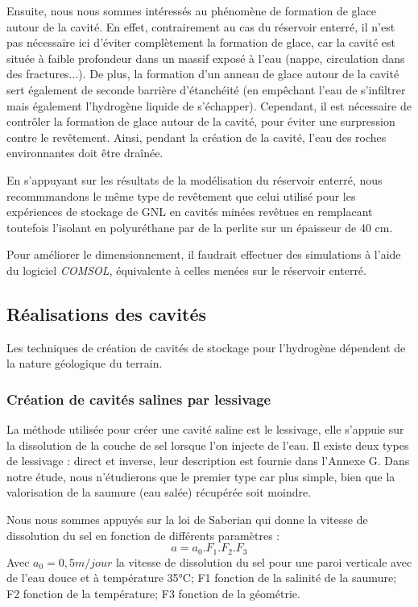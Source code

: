 \documentclass[11pt,french,a4paper]{article}
\begin{document}
Ensuite, nous nous sommes intéressés au phénomène de formation de glace autour de la cavité. En effet, contrairement au cas du réservoir enterré, il n’est pas nécessaire ici d’éviter complètement la formation de glace, car la cavité est située à faible profondeur dans un massif exposé à l'eau (nappe, circulation dans des fractures...). De plus, la formation d’un anneau de glace autour de la cavité sert également de seconde barrière d’étanchéité (en empêchant l’eau de s’infiltrer mais également l’hydrogène liquide de s’échapper). Cependant, il est nécessaire de contrôler la formation de glace autour de la cavité, pour éviter une surpression contre le revêtement. Ainsi, pendant la création de la cavité, l’eau des roches environnantes doit être draînée. 

En s'appuyant sur les résultats de la modélisation du réservoir enterré, nous recommmandons le même type de revêtement que celui utilisé pour les expériences de stockage de GNL en cavités minées revêtues en remplacant toutefois l'isolant en polyuréthane par de la perlite sur un épaisseur de 40 cm.

Pour améliorer le dimensionnement, il faudrait effectuer des simulations à l’aide du logiciel \emph{COMSOL}, équivalente à celles menées sur le réservoir enterré.\\



\subsection{Réalisations des cavités}
Les techniques de création de cavités de stockage pour l'hydrogène dépendent de la nature géologique du terrain. 

\subsubsection{Création de cavités salines par lessivage}
La méthode utilisée pour créer une cavité saline est le lessivage, elle s’appuie sur la dissolution de la couche de sel lorsque l’on injecte de l’eau. Il existe deux types de lessivage : direct et inverse, leur description est fournie dans l'Annexe G. Dans notre étude, nous n’étudierons que le premier type car plus simple, bien que la valorisation de la saumure (eau salée) récupérée soit moindre. 

Nous nous sommes appuyés sur la loi de Saberian qui donne la vitesse de dissolution du sel en fonction de différents paramètres : 
$$ a = a_0 . F_1 . F_2 . F_3  $$
Avec  $a_0 = 0,5 m/jour$ la vitesse de dissolution du sel pour une paroi verticale avec de l’eau douce et à température 35°C; F1 fonction de la salinité de la saumure; F2 fonction de la température; F3 fonction de la géométrie.\\
\end{document}
